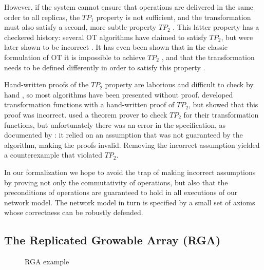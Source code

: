 However, if the system cannot ensure that operations are delivered in the same order to all
replicas, the $\mathit{TP}_1$ property is not sufficient, and the transformation must also satisfy a
second, more subtle property $\mathit{TP}_2$ \cite{Ressel:1996wx}. This latter property has a
checkered history: several OT algorithms have claimed to satisfy $\mathit{TP}_2$, but were later
shown to be incorrect \cite{Imine:2003ks,Imine:2006kn,Oster:2005vi}. It has even been shown that in
the classic formulation of OT it is impossible to achieve $\mathit{TP}_2$ \cite{Randolph:2015gj},
and that the transformation needs to be defined differently in order to satisfy this property
\cite{Oster:2006tr}.

Hand-written proofs of the $\mathit{TP}_2$ property are laborious and difficult to check by hand
\cite{Li:2008hw,Li:2005jq}, so most algorithms have been presented without proof.
\citet{Suleiman:1998eu} developed transformation functions with a hand-written proof of
$\mathit{TP}_2$, but \citet{Oster:2005vi} showed that this proof was incorrect.
\citet{Imine:2003ks} used a theorem prover to check $\mathit{TP}_2$ for their transformation
functions, but unfortunately there was an error in the specification, as documented by
\citet{Oster:2005vi}: it relied on an assumption that was not guaranteed by the algorithm, making
the proofs invalid. Removing the incorrect assumption yielded a counterexample that violated
$\mathit{TP}_2$.

In our formalization we hope to avoid the trap of making incorrect assumptions by proving not only
the commutativity of operations, but also that the preconditions of operations are guaranteed to
hold in all executions of our network model. The network model in turn is specified by a small set
of axioms whose correctness can be robustly defended.



\subsection{The Replicated Growable Array (RGA)}\label{sect.rga.background}

\begin{figure}
\centering

\caption{RGA example}\label{fig.two-lists}
\end{figure}
